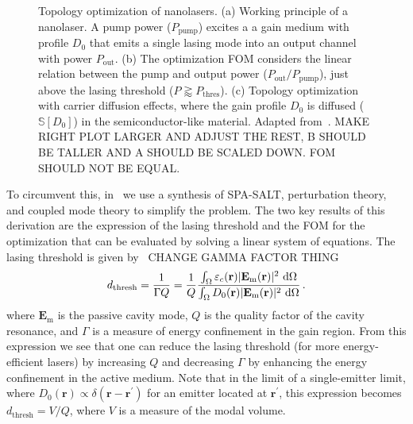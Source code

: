 \begin{figure}[tb]
    \centering
    \caption{Topology optimization of nanolasers. (a) Working principle of a nanolaser. A pump power ($P_\text{pump}$) excites a a gain medium with profile
    $D_0$ that emits a single lasing mode into an output channel with power $P_\text{out}$. (b) The optimization FOM considers the linear relation between the pump and output power ($P_\text{out}/P_\text{pump}$),
    just above the lasing threshold ($P \gtrapprox P_\text{thres}$). (c) Topology optimization with carrier diffusion effects, where the gain profile $D_0$ is diffused ($\mathbb{S}[D_0]$)
    in the semiconductor-like material. Adapted from~\cite{ownpub4}. MAKE RIGHT PLOT LARGER AND ADJUST THE REST, B SHOULD BE TALLER AND A SHOULD BE SCALED DOWN. FOM SHOULD NOT BE EQUAL.}
    \label{fig:laser2d}
\end{figure}

To circumvent this, in~\cite{ownpub4} we use a synthesis of SPA-SALT, perturbation theory, and coupled mode theory to simplify the problem. 
The two key results of this derivation are the expression of the lasing threshold and the FOM for the optimization that can be evaluated by solving a linear system of equations.
The lasing threshold is given by~\cite{ownpub4} CHANGE GAMMA FACTOR THING
\begin{equation}\label{eq:pump_thresh}
    d_\text{thresh} = \frac{1}{\Gamma Q} = \frac{1}{Q} \frac{\int_{\Omega} \varepsilon_c(\mathbf{r})|\mathbf{E}_{\text{m}}(\mathbf{r})|^2\,  \mathop{}\!\text{d} \Omega}{\int_{\Omega} D_0(\mathbf{r}) |\mathbf{E}_{\text{m}}(\mathbf{r})|^2\,  \mathop{}\!\text{d} \Omega}\,.
\end{equation}
where $\mathbf{E}_\text{m}$ is the passive cavity mode, $Q$ is the quality factor of the cavity resonance, and $\Gamma$ is a measure 
of energy confinement in the gain region. From this expression we see that one can reduce the lasing threshold (for more energy-efficient lasers) by increasing $Q$ and decreasing $\Gamma$ by enhancing the energy confinement in the
active medium. Note that in the limit of a single-emitter limit, where $D_0(\mathbf{r})\propto \delta (\mathbf{r}-\mathbf{r^\prime})$ for an emitter located at $\mathbf{r}^\prime$, this expression becomes $d_\text{thresh}=V/Q$, where $V$ is a measure
of the modal volume.


